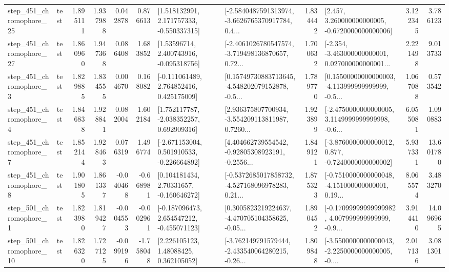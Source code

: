 \begin{tabular}{llrrrrllrlrr}
  step\_451\_chromophore\_25 &      test &      1.895111 &    1.937988 &      0.042878 &  0.876613 &    [1.518132991, 2.171757333, -0.550337315] &  [-2.5840487591313974, -3.6626765370917784, 0.4... &       1.834442 &    [2.457, 3.260000000000005, -0.6720000000000006] &            3.122345 &          3.786123 \\
  step\_451\_chromophore\_27 &      test &      1.860960 &    1.947368 &      0.086408 &  1.683852 &     [1.53596714, 2.400743916, -0.095318756] &  [-2.4061026780547574, -3.719498136870657, 0.72... &       1.700632 &  [-2.354, -3.463000000000001, 0.027000000000001... &            2.221498 &          9.013733 \\
   step\_451\_chromophore\_3 &      test &      1.829885 &    1.834555 &      0.004670 &  0.168082 &    [-0.111061489, 2.764852416, 0.425175009] &  [0.15749730883713645, -4.548202079152878, -0.5... &       1.789770 &  [0.15500000000000003, -4.113999999999999, -0.5... &            1.067088 &          0.573542 \\
   step\_451\_chromophore\_4 &      test &      1.846838 &    1.928841 &      0.082004 &  1.602184 &    [1.752117787, -2.038352257, 0.692909316] &  [2.936375807700934, -3.554209113811987, 0.7260... &       1.923899 &  [-2.4750000000000005, 3.1149999999999998, -0.6... &            6.055081 &          1.090883 \\
   step\_451\_chromophore\_7 &      test &      1.852144 &    1.928463 &      0.076319 &  1.496774 &   [-2.671153004, 0.501910533, -0.226664892] &  [4.404662739554542, -0.92805308923191, -0.2556... &       1.849121 &  [-3.8760000000000012, 0.877, -0.7240000000000002] &            5.937331 &         13.601780 \\
   step\_451\_chromophore\_8 &      test &      1.901805 &    1.861337 &     -0.040468 & -0.668981 &     [0.104181434, 2.70331657, -0.160646272] &  [-0.5372685017858732, -4.527168096978283, 0.21... &       1.875323 &  [-0.7510000000000048, -4.151000000000001, 0.19... &            8.065574 &          3.483270 \\
   step\_501\_chromophore\_1 &      test &      1.823980 &    1.819427 &     -0.004553 & -0.002961 &   [-0.187096473, 2.654547212, -0.455071123] &  [0.3005823219224637, -4.470705104358625, -0.05... &       1.890452 &  [-0.17099999999999982, 4.007999999999999, -0.9... &            3.914410 &         14.096965 \\
  step\_501\_chromophore\_10 &      test &      1.826320 &    1.727125 &     -0.099196 & -1.758048 &      [2.226105123, 1.48088425, 0.362105052] &  [-3.762149791579444, -2.433540064280215, -0.26... &       1.809848 &  [-3.5500000000000043, -2.2250000000000005, -0.... &            2.017136 &          3.081301 \\

\end{tabular}
